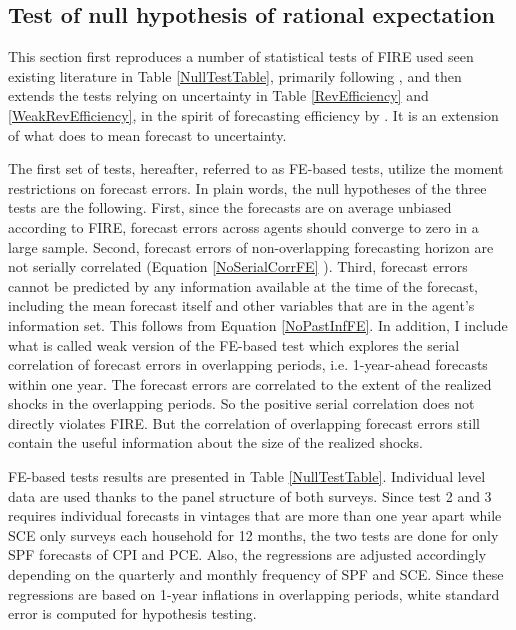\documentclass[]{article}
\begin{document}
	
	\subsection{Test of null hypothesis of rational expectation}\label{NullTest}
	
	This section first reproduces a number of statistical tests of FIRE used seen existing literature in Table \ref{NullTestTable}, primarily following \citet{mankiw2003disagreement},  and then extends the tests relying on uncertainty in Table \ref{RevEfficiency} and \ref{WeakRevEfficiency}, in the spirit of forecasting efficiency by \citet{nordhaus1987forecasting}. It is an extension of what \citet{fuhrer2018intrinsic} does to mean forecast to uncertainty.  
	
	The first set of tests, hereafter, referred to as FE-based tests, utilize the moment restrictions on forecast errors. In plain words, the null hypotheses of the three tests are the following. First, since the forecasts are on average unbiased according to FIRE, forecast errors across agents should converge to zero in a large sample. Second, forecast errors of non-overlapping forecasting horizon are not serially correlated (Equation \ref{NoSerialCorrFE} ).  Third, forecast errors cannot be predicted by any information available at the time of the forecast, including the mean forecast itself and other variables that are in the agent's information set. This follows from Equation \ref{NoPastInfFE}. In addition, I include what is called weak version of the FE-based test which explores the serial correlation of forecast errors in overlapping periods,  i.e. 1-year-ahead forecasts within one year. The forecast errors are correlated to the extent of the realized shocks in the overlapping periods. So the positive serial correlation does not directly violates FIRE. But the correlation of overlapping forecast errors still contain the useful information about the size of the realized shocks. 
	
	FE-based tests results are presented in Table \ref{NullTestTable}. Individual level data are used thanks to the panel structure of both surveys. Since test 2 and 3 requires individual forecasts in vintages that are more than one year apart while SCE only surveys each household for 12 months, the two tests are done for only SPF forecasts of CPI and PCE. Also, the regressions are adjusted accordingly depending on the quarterly and monthly frequency of SPF and SCE. Since these regressions are based on 1-year inflations in overlapping periods, white standard error is computed for hypothesis testing. 
	
\end{document}
